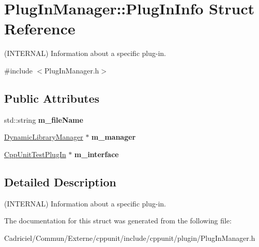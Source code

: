 \hypertarget{struct_plug_in_manager_1_1_plug_in_info}{\section{Plug\-In\-Manager\-:\-:Plug\-In\-Info Struct Reference}
\label{struct_plug_in_manager_1_1_plug_in_info}
}


(I\-N\-T\-E\-R\-N\-A\-L) Information about a specific plug-\/in.  




{\ttfamily \#include $<$Plug\-In\-Manager.\-h$>$}

\subsection*{Public Attributes}
\begin{DoxyCompactItemize}
\item 
\hypertarget{struct_plug_in_manager_1_1_plug_in_info_ac084e2efe4d9953812eff03966c06988}{std\-::string {\bfseries m\-\_\-file\-Name}}\label{struct_plug_in_manager_1_1_plug_in_info_ac084e2efe4d9953812eff03966c06988}

\item 
\hypertarget{struct_plug_in_manager_1_1_plug_in_info_a1889712db485e16a29c45ecba4780f0a}{\hyperlink{class_dynamic_library_manager}{Dynamic\-Library\-Manager} $\ast$ {\bfseries m\-\_\-manager}}\label{struct_plug_in_manager_1_1_plug_in_info_a1889712db485e16a29c45ecba4780f0a}

\item 
\hypertarget{struct_plug_in_manager_1_1_plug_in_info_a306eb58a5d6881b117d6bb9a9ae46589}{\hyperlink{struct_cpp_unit_test_plug_in}{Cpp\-Unit\-Test\-Plug\-In} $\ast$ {\bfseries m\-\_\-interface}}\label{struct_plug_in_manager_1_1_plug_in_info_a306eb58a5d6881b117d6bb9a9ae46589}

\end{DoxyCompactItemize}


\subsection{Detailed Description}
(I\-N\-T\-E\-R\-N\-A\-L) Information about a specific plug-\/in. 

The documentation for this struct was generated from the following file\-:\begin{DoxyCompactItemize}
\item 
Cadriciel/\-Commun/\-Externe/cppunit/include/cppunit/plugin/Plug\-In\-Manager.\-h\end{DoxyCompactItemize}
